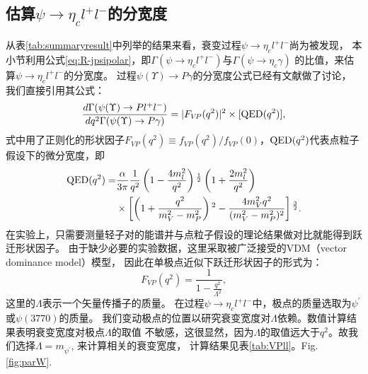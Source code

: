 \subsection{估算$\psi \to \eta_c l^{+} l^{-}$的分宽度}
从表\ref{tab:summaryresult}中列举的结果来看，衰变过程$\psi \to \eta_c l^{+} l^{-}$尚为被发现，
本小节利用公式\ref{eq:R-jpsipolar}，即$\Gamma(\psi \to \eta_{c} l^{+} l^{-})$与$\Gamma(\psi \to \eta_{c} \gamma)$
的比值，来估算$\psi \to \eta_c l^{+} l^{-}$的分宽度。
过程$\psi(\Upsilon) \to P \gamma$的分宽度公式已经有文献\cite{Fu:2011yy}做了讨论，
我们直接引用其公式：
\begin{equation}
\frac{d\Gamma(\psi(\Upsilon)\to Pl^{+}l^{-})}{dq^{2}\Gamma(\psi(\Upsilon) \to P \gamma)} 
    = |F_{V\!P}(q^{2})|^{2} \times [{\rm QED}(q^{2})],
\label{equ:calVPll}
\end{equation}
式中用了正则化的形状因子$F_{V\!P}(q^{2}) \equiv
f_{V\!P}(q^{2})/f_{V\!P}(0)$，${\rm QED}(q^{2})$代表点粒子
假设下的微分宽度，即
\begin{equation}
\begin{split}
    {\rm QED}(q^{2}) = & \frac{\alpha}{3\pi} \frac{1}{q^{2}}
    \left(1-\frac{4m^{2}_{l}}{q^{2}} \right ){}^{\frac{1}{2}} \left(1 +
    \frac{2m^{2}_{l}}{q^{2}} \right)  \\ & \times \left[ \left(1 +
    \frac{q^{2}}{m^{2}_{V} - m^{2}_{P}} \right){}^{2}  -
    \frac{4m^{2}_{V}q^{2}}{(m^{2}_{V} - m^{2}_{P}){}^{2}} \right]
    {}^{\frac{3}{2}}.
\end{split}
\end{equation}
在实验上，只需要测量轻子对的能谱并与点粒子假设的理论结果做对比就能得到跃迁形状因子\cite{Landsberg:1986fd}。
由于缺少必要的实验数据，这里采取被广泛接受的VDM（vector dominance model）模型\cite{GellMann:1961tg, Bauer:1977iq}，
因此在单极点近似下跃迁形状因子的形式为：
\begin{equation}
\label{fractor}
F_{V\!P}(q^{2}) = \frac{1}{1-\frac{q^{2}}{\Lambda^{2}}},
\end{equation}
这里的$\Lambda$表示一个矢量传播子的质量。
在过程$\psi \to \eta_{c} l^{+} l^{-}$中，极点的质量选取为$\psi^{\prime}$或$\psi(3770)$的质量。
我们变动极点的位置以研究衰变宽度对$\Lambda$依赖。数值计算结果表明衰变宽度对极点$\Lambda$的取值
不敏感，这很显然，因为$\Lambda$的取值远大于$q^{2}$。故我们选择$\Lambda =m_{\psi^{\prime}}$,
来计算相关的衰变宽度， 计算结果见表\ref{tab:VPll}。Fig.\ref{fig:parW}.
